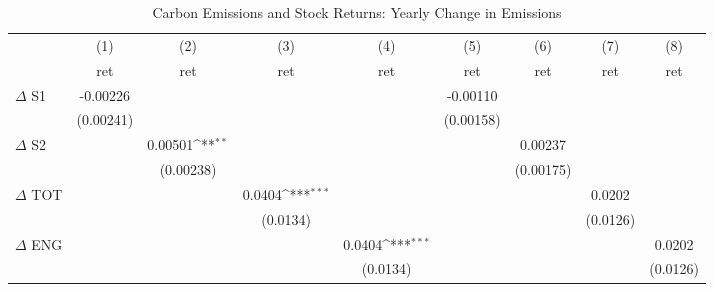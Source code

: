 \begin{table}[htbp]\centering
\def\sym#1{\ifmmode^{#1}\else\(^{#1}\)\fi}
\caption{Carbon Emissions and Stock Returns: Yearly Change in Emissions}
\begin{tabular}{l*{8}{c}}
\hline\hline
                    &\multicolumn{1}{c}{(1)}&\multicolumn{1}{c}{(2)}&\multicolumn{1}{c}{(3)}&\multicolumn{1}{c}{(4)}&\multicolumn{1}{c}{(5)}&\multicolumn{1}{c}{(6)}&\multicolumn{1}{c}{(7)}&\multicolumn{1}{c}{(8)}\\
                    &\multicolumn{1}{c}{ret}&\multicolumn{1}{c}{ret}&\multicolumn{1}{c}{ret}&\multicolumn{1}{c}{ret}&\multicolumn{1}{c}{ret}&\multicolumn{1}{c}{ret}&\multicolumn{1}{c}{ret}&\multicolumn{1}{c}{ret}\\
\hline
$\Delta$ S1         &    -0.00226         &                     &                     &                     &    -0.00110         &                     &                     &                     \\
                    &   (0.00241)         &                     &                     &                     &   (0.00158)         &                     &                     &                     \\
$\Delta$ S2         &                     &     0.00501\sym{**} &                     &                     &                     &     0.00237         &                     &                     \\
                    &                     &   (0.00238)         &                     &                     &                     &   (0.00175)         &                     &                     \\
$\Delta$ TOT        &                     &                     &      0.0404\sym{***}&                     &                     &                     &      0.0202         &                     \\
                    &                     &                     &    (0.0134)         &                     &                     &                     &    (0.0126)         &                     \\
$\Delta$ ENG        &                     &                     &                     &      0.0404\sym{***}&                     &                     &                     &      0.0202         \\
                    &                     &                     &                     &    (0.0134)         &                     &                     &                     &    (0.0126)         \\

\end{tabular}
\end{table}
